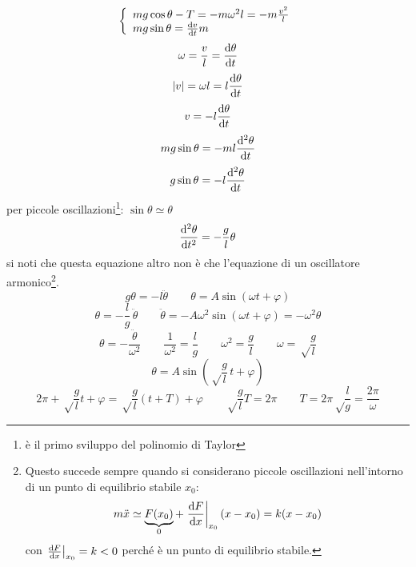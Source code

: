 \begin{equation*}\left\{
  \begin{array}{l}
  mg\cos\theta-T=-m\omega^2l=-m\frac{v^2}{l}\\
  mg\sin\theta=\frac{\mathrm{d} v}{\mathrm{d} t}m
  \end{array}
  \right.\end{equation*}
\begin{equation*}\omega=\frac{v}{l}=\frac{\mathrm{d}\theta}{\mathrm{d} t}\end{equation*}
\begin{equation*}|v|=\omega l=l\frac{\mathrm{d}\theta}{\mathrm{d} t}\end{equation*}
\begin{equation*}v=-l\frac{\mathrm{d}\theta}{\mathrm{d} t}\end{equation*}
\begin{equation*}mg\sin\theta=-ml\frac{\mathrm{d}^2\theta}{\mathrm{d} t}\end{equation*}
\begin{equation*}g\sin\theta=-l\frac{\mathrm{d}^2\theta}{\mathrm{d} t}\end{equation*}
per piccole oscillazioni\footnote{è il primo sviluppo del polinomio di Taylor}: $\sin\theta\simeq\theta$
\begin{equation*}\frac{\mathrm{d}^2\theta}{\mathrm{d} t^2}=-\frac{g}{l}\theta\end{equation*}
si noti che questa equazione altro non è che l'equazione di un oscillatore armonico\footnote{Questo succede sempre quando si considerano piccole oscillazioni nell'intorno di un punto di equilibrio stabile $x_0$:
\begin{equation*}
 m\ddot x \simeq \underbrace{F(x_0)}_0 + \left.\frac{\mathrm{d} F}{\mathrm{d} x}\right|_{x_0} (x-x_0) = k (x-x_0)
\end{equation*}
con $\left.\frac{\mathrm{d} F}{\mathrm{d} x}\right|_{x_0}=k<0$ perché è un punto di equilibrio stabile.
}.
\[g\theta=-l\ddot\theta\qquad \theta=A\sin\left(\omega
t+\varphi\right)\]
\[\theta=-\frac{l}{g}\,\ddot\theta\qquad\ddot\theta=-A\omega^2\sin\left(\omega
t+\varphi\right)=-\omega^2\theta\]
\begin{equation*}\theta=-\frac{\ddot\theta}{\omega^2}\qquad \frac{1}{\omega^2}=\frac{l}{g}\qquad\omega^2=\frac{g}{l}\qquad\omega=\sqrt\frac{g}{l}\end{equation*}
\begin{equation*}\theta=A\sin\left(\sqrt\frac{g}{l}\,t+\varphi\right)\end{equation*}
\[2\pi+\sqrt\frac{g}{l}t+\varphi=\sqrt\frac{g}{l}(t+T)+\varphi\qquad
\sqrt\frac{g}{l}T=2\pi\qquad
T=2\pi\sqrt\frac{l}{g}=\frac{2\pi}{\omega}\]

